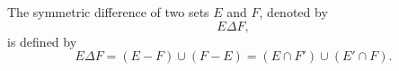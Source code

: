 The symmetric difference of two sets $E$ and $F$, denoted by
$$E \Delta F,$$
is defined by
$$E \Delta F = (E - F) \cup (F - E) = (E \cap F') \cup (E' \cap F).$$
